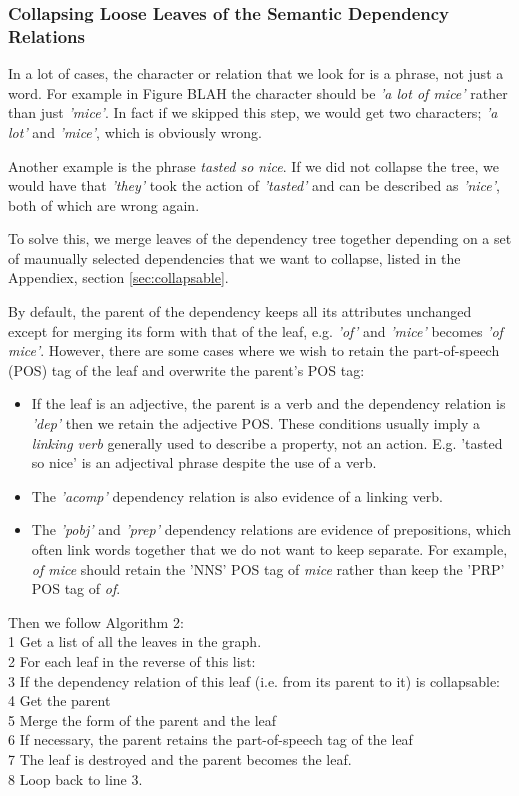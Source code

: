 \subsubsection{Collapsing Loose Leaves of the Semantic Dependency Relations}
\label{sec:collapse}

In a lot of cases, the character or relation that we look for is a phrase, not just a word. For example in Figure BLAH the character should be \textit{'a lot of mice'} rather than just \textit{'mice'}. In fact if we skipped this step, we would get two characters; \textit{'a lot'} and \textit{'mice'}, which is obviously wrong.

Another example is the phrase \textit{tasted so nice}. If we did not collapse the tree, we would have that \textit{'they'} took the action of \textit{'tasted'} and can be described as \textit{'nice'}, both of which are wrong again.

To solve this, we merge leaves of the dependency tree together depending on a set of maunually selected dependencies that we want to collapse, listed in the Appendiex, section \ref{sec:collapsable}.

By default, the parent of the dependency keeps all its attributes unchanged except for merging its form with that of the leaf, e.g. \textit{'of'} and \textit{'mice'} becomes \textit{'of mice'}. However, there are some cases where we wish to retain the part-of-speech (POS) tag of the leaf and overwrite the parent's POS tag:

\begin{itemize}
\item{If the leaf is an adjective, the parent is a verb and the dependency relation is \textit{'dep'} then we retain the adjective POS. These conditions usually imply a \textit{linking verb} generally used to describe a property, not an action. E.g. 'tasted so nice' is an adjectival phrase despite the use of a verb.}
\item{The \textit{'acomp'} dependency relation is also evidence of a linking verb.}
\item{The \textit{'pobj'} and \textit{'prep'} dependency relations are evidence of prepositions, which often link words together that we do not want to keep separate. For example, \textit{of mice} should retain the 'NNS' POS tag of \textit{mice} rather than keep the 'PRP' POS tag of \textit{of}. }
\end{itemize}

Then we follow Algorithm 2:\\
1 Get a list of all the leaves in the graph.\\
2 For each leaf in the reverse of this list:\\
3	If the dependency relation of this leaf (i.e. from its parent to it) is collapsable:\\
4		Get the parent\\
5		Merge the form of the parent and the leaf\\
6		If necessary, the parent retains the part-of-speech tag of the leaf\\
7		The leaf is destroyed and the parent becomes the leaf.\\
8		Loop back to line 3.\\

